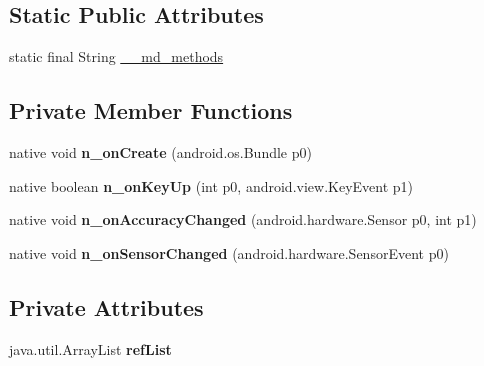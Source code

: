 \subsection*{Static Public Attributes}
\begin{DoxyCompactItemize}
\item 
static final String \hyperlink{classmd5e5bf58b44a1ae043005510c92804be87_1_1Activity1_a610e6be497ac42c587579ff31c932994}{\+\_\+\+\_\+md\+\_\+methods}
\end{DoxyCompactItemize}
\subsection*{Private Member Functions}
\begin{DoxyCompactItemize}
\item 
\mbox{\label{classmd5e5bf58b44a1ae043005510c92804be87_1_1Activity1_a3e411ead99bfce32c778ffb0b6905900}} 
native void {\bfseries n\+\_\+on\+Create} (android.\+os.\+Bundle p0)
\item 
\mbox{\label{classmd5e5bf58b44a1ae043005510c92804be87_1_1Activity1_afa3472ede31ad863ed9dcf93ba44e457}} 
native boolean {\bfseries n\+\_\+on\+Key\+Up} (int p0, android.\+view.\+Key\+Event p1)
\item 
\mbox{\label{classmd5e5bf58b44a1ae043005510c92804be87_1_1Activity1_ab54b447ec77ad7b0402a4a50cd266aae}} 
native void {\bfseries n\+\_\+on\+Accuracy\+Changed} (android.\+hardware.\+Sensor p0, int p1)
\item 
\mbox{\label{classmd5e5bf58b44a1ae043005510c92804be87_1_1Activity1_a48674a23d1d9a18c901fc1b7817cbf15}} 
native void {\bfseries n\+\_\+on\+Sensor\+Changed} (android.\+hardware.\+Sensor\+Event p0)
\end{DoxyCompactItemize}
\subsection*{Private Attributes}
\begin{DoxyCompactItemize}
\item 
\mbox{\label{classmd5e5bf58b44a1ae043005510c92804be87_1_1Activity1_ac95d42492dd267e48f4ddc2524eba3b6}} 
java.\+util.\+Array\+List {\bfseries ref\+List}
\end{DoxyCompactItemize}


